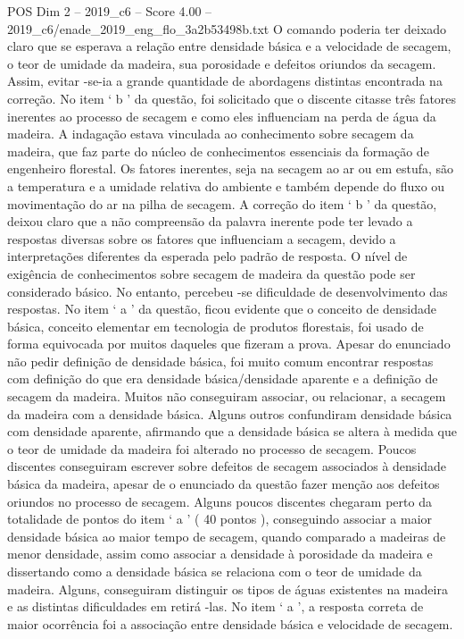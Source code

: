 \begin{textsample}{POS Dim 2 – 2019\_c6 – Score 4.00 – 2019\_c6/enade\_2019\_eng\_flo\_3a2b53498b.txt}
O comando poderia ter deixado claro que se esperava a relação entre densidade básica e a velocidade de secagem, o teor de umidade da madeira, sua porosidade e defeitos oriundos da secagem.
Assim, evitar -se-ia a grande quantidade de abordagens distintas encontrada na correção.
No item ‘ b ’ da questão, foi solicitado que o discente citasse três fatores inerentes ao processo de secagem e como eles influenciam na perda de água da madeira.
A indagação estava vinculada ao conhecimento sobre secagem da madeira, que faz parte do núcleo de conhecimentos essenciais da formação de engenheiro florestal.
Os fatores inerentes, seja na secagem ao ar ou em estufa, são a temperatura e a umidade relativa do ambiente e também depende do fluxo ou movimentação do ar na pilha de secagem.
A correção do item ‘ b ’ da questão, deixou claro que a não compreensão da palavra inerente pode ter levado a respostas diversas sobre os fatores que influenciam a secagem, devido a interpretações diferentes da esperada pelo padrão de resposta.
O nível de exigência de conhecimentos sobre secagem de madeira da questão pode ser considerado básico.
No entanto, percebeu -se dificuldade de desenvolvimento das respostas.
No item ‘ a ’ da questão, ficou evidente que o conceito de densidade básica, conceito elementar em tecnologia de produtos florestais, foi usado de forma equivocada por muitos daqueles que fizeram a prova.
Apesar do enunciado não pedir definição de densidade básica, foi muito comum encontrar respostas com definição do que era densidade básica/densidade aparente e a definição de secagem da madeira.
Muitos não conseguiram associar, ou relacionar, a secagem da madeira com a densidade básica.
Alguns outros confundiram densidade básica com densidade aparente, afirmando que a densidade básica se altera à medida que o teor de umidade da madeira foi alterado no processo de secagem.
Poucos discentes conseguiram escrever sobre defeitos de secagem associados à densidade básica da madeira, apesar de o enunciado da questão fazer menção aos defeitos oriundos no processo de secagem.
Alguns poucos discentes chegaram perto da totalidade de pontos do item ‘ a ’ ( 40 pontos ), conseguindo associar a maior densidade básica ao maior tempo de secagem, quando comparado a madeiras de menor densidade, assim como associar a densidade à porosidade da madeira e dissertando como a densidade básica se relaciona com o teor de umidade da madeira.
Alguns, conseguiram distinguir os tipos de águas existentes na madeira e as distintas dificuldades em retirá -las.
No item ‘ a ’, a resposta correta de maior ocorrência foi a associação entre densidade básica e velocidade de secagem.

\end{textsample}
